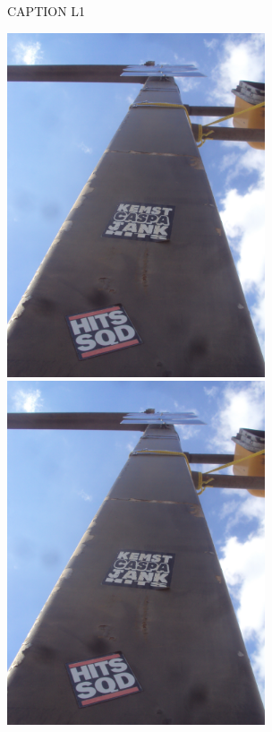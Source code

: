 \documentclass[10pt,letterpaper]{article}
\begin{document}
CAPTION L1\\
\pagebreak

\includegraphics[height=4in]{portrait.jpg}
\includegraphics[height=4in]{portrait.jpg}
\end{document}
